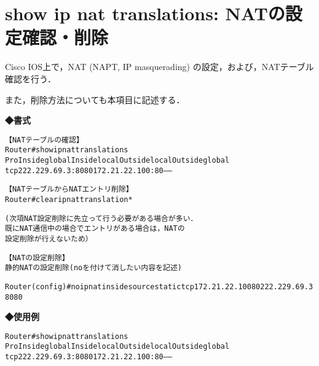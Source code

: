 \section{show ip nat translations: NATの設定確認・削除}
\label{cmd:ios-show-int-status-nat}
Cisco IOS上で，NAT (NAPT, IP masquerading) の設定，および，NATテーブル確認を行う．

また，削除方法についても本項目に記述する．


\noindent
{\bf ◆書式}
\begin{center}
\begin{screen}
\begin{alltt}
【NATテーブルの確認】
Router#show ip nat translations
Pro Inside global         Inside local          Outside local         Outside global
tcp 222.229.69.3:8080     172.21.22.100:80      ---                   ---

【NATテーブルからNATエントリ削除】
Router#clear ip nat translation *

(次項NAT設定削除に先立って行う必要がある場合が多い．
 既にNAT通信中の場合でエントリがある場合は，NATの
 設定削除が行えないため）

【NATの設定削除】
静的 NAT の設定削除 (no を付けて消したい内容を記述)

Router(config)#no ip nat inside source static tcp 172.21.22.100 80 222.229.69.3 8080
\end{alltt}
\end{screen}
\end{center}


{\bf ◆使用例}
\begin{center}
\begin{breakbox}
\begin{alltt}
Router#show ip nat translations
Pro Inside global         Inside local          Outside local         Outside global
tcp 222.229.69.3:8080     172.21.22.100:80      ---                   ---

\end{alltt}
\end{breakbox}
\end{center}
                

